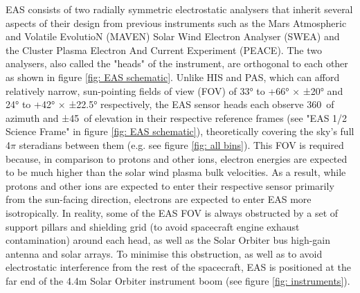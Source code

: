 EAS consists of two radially symmetric electrostatic analysers that inherit several aspects of their design from previous instruments such as the Mars Atmospheric and Volatile EvolutioN (MAVEN) Solar Wind Electron Analyser (SWEA)\cite{mitchell2016} and the Cluster Plasma Electron And Current Experiment (PEACE)\cite{johnstone1997}. The two analysers, also called the "heads" of the instrument\cite{owen2021}, are orthogonal to each other as shown in figure \ref{fig: EAS schematic}. Unlike HIS and PAS, which can afford relatively narrow, sun-pointing fields of view (FOV) of 33° to +66° × ±20° and 24° to +42° × ±22.5° respectively, the EAS sensor heads each observe 360\degree\ of azimuth and ±45\degree\ of elevation in their respective reference frames (see "EAS 1/2 Science Frame" in figure \ref{fig: EAS schematic}), theoretically covering the sky's full 4\(\pi\) steradians between them (e.g. see figure \ref{fig: all bins}). This FOV is required because, in comparison to protons and other ions, electron energies are expected to be much higher than the solar wind plasma bulk velocities. As a result, while protons and other ions are expected to enter their respective sensor primarily from the sun-facing direction, electrons are expected to enter EAS more isotropically\cite{owen2020}. In reality, some of the EAS FOV is always obstructed by a set of support pillars and shielding grid (to avoid spacecraft engine exhaust contamination) around each head, as well as the Solar Orbiter bus high-gain antenna and solar arrays\cite{owen2020}\cite{owen2021}\cite{dickson2024}. To minimise this obstruction, as well as to avoid electrostatic interference from the rest of the spacecraft,  EAS is positioned at the far end of the 4.4m Solar Orbiter instrument boom (see figure \ref{fig: instruments})\cite{owen2020}\cite{olaskoaga2017}.
\\

